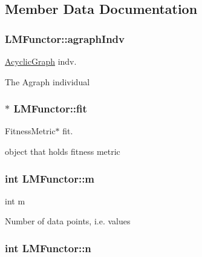 \subsection{Member Data Documentation}
\subsubsection[{\texorpdfstring{agraph\+Indv}{agraphIndv}}]{ L\+M\+Functor\+::agraph\+Indv}\hypertarget{structLMFunctor_aece2cab33ffd2f919fe9e6817e3a85ac}{}\label{structLMFunctor_aece2cab33ffd2f919fe9e6817e3a85ac}


\hyperlink{classAcyclicGraph}{Acyclic\+Graph} indv. 

The Agraph individual 
\subsubsection[{\texorpdfstring{fit}{fit}}]{$\ast$ L\+M\+Functor\+::fit}\hypertarget{structLMFunctor_a39d6ef99670d28134bd7a903993f5e23}{}\label{structLMFunctor_a39d6ef99670d28134bd7a903993f5e23}


Fitness\+Metric$\ast$ fit. 

object that holds fitness metric 
\subsubsection[{\texorpdfstring{m}{m}}]{\setlength{\rightskip}{0pt plus 5cm}int L\+M\+Functor\+::m}\hypertarget{structLMFunctor_a090d075bceebea8c93aa70a99e7620d5}{}\label{structLMFunctor_a090d075bceebea8c93aa70a99e7620d5}


int m 

Number of data points, i.\+e. values 
\subsubsection[{\texorpdfstring{n}{n}}]{\setlength{\rightskip}{0pt plus 5cm}int L\+M\+Functor\+::n}\hypertarget{structLMFunctor_a97d53b5fcdf96c8ffe5ea70b7adc0de4}{}\label{structLMFunctor_a97d53b5fcdf96c8ffe5ea70b7adc0de4}


